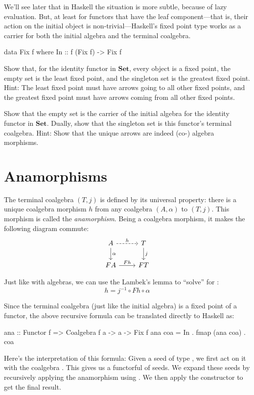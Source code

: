 \documentclass[DaoFP]{subfiles}
\begin{document}
We'll see later that in Haskell the situation is more subtle, because of lazy evaluation. But, at least for functors that have the leaf component---that is, their action on the initial object is non-trivial---Haskell's fixed point type works as a carrier for both the initial algebra and the terminal coalgebra.
\begin{haskell}
data Fix f where
  In :: f (Fix f) -> Fix f
\end{haskell}

\begin{exercise}
Show that, for the identity functor in $\mathbf{Set}$, every object is a fixed point, the empty set is the least fixed point, and the singleton set is the greatest fixed point. Hint: The least fixed point must have arrows going to all other fixed points, and the greatest fixed point must have arrows coming from all other fixed points.
\end{exercise}

\begin{exercise}
Show that the empty set is the carrier of the initial algebra for the identity functor in $\mathbf{Set}$. Dually, show that the singleton set is this functor's terminal coalgebra. Hint: Show that the unique arrows are indeed (co-) algebra morphisms.
\end{exercise}

\section{Anamorphisms}

The terminal coalgebra $(T, j)$ is defined by its universal property: there is a unique coalgebra morphism $h$ from any coalgebra $(A, \alpha)$ to $(T, j)$.  This morphism is called the \emph{anamorphism}. Being a coalgebra morphism, it makes the following diagram commute:
\[
 \begin{tikzcd}
 A 
 \arrow[r, dashed, "h"]
 \arrow[d, "\alpha"]
 & T
\arrow[d, "j"]
 \\
 F A
 \arrow[r,  "F h"]
 & F T
  \end{tikzcd}
\]
 
 Just like with algebras, we can use the Lambek's lemma to ``solve'' for :
 \[ h = j^{-1} \circ F h \circ \alpha \]
 
 Since the terminal coalgebra (just like the initial algebra) is a fixed point of a functor, the above recursive formula can be translated directly to Haskell as:
 \begin{haskell}
ana :: Functor f => Coalgebra f a -> a -> Fix f
ana coa = In . fmap (ana coa) . coa 
\end{haskell}
Here's the interpretation of this formula: Given a seed of type , we first act on it with the coalgebra . This gives us a functorful of seeds. We expand these seeds by recursively applying the anamorphism using . We then apply the constructor  to get the final result.
 
\end{document}
